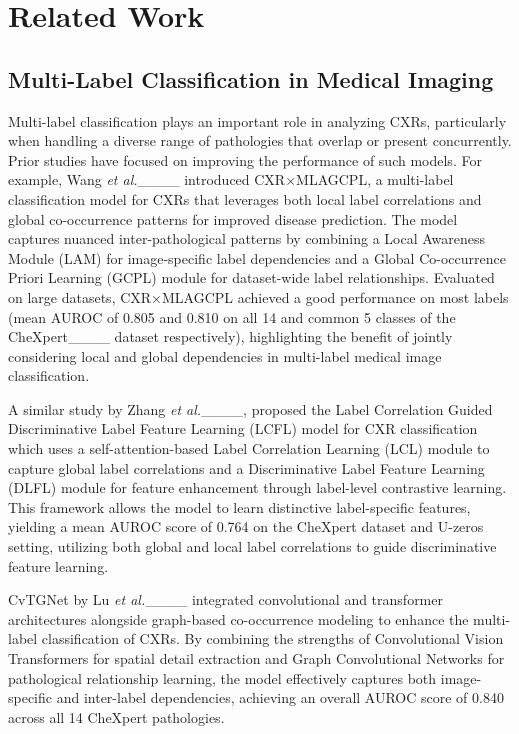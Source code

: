 \section{Related Work}
\subsection{Multi-Label Classification in Medical Imaging}
Multi-label classification plays an important role in analyzing CXRs, particularly when handling a diverse range of pathologies that overlap or present concurrently. Prior studies have focused on improving the performance of such models. For example, Wang \textit{et al.}____ introduced CXR×MLAGCPL, a multi-label classification model for CXRs that leverages both local label correlations and global co-occurrence patterns for improved disease prediction. The model captures nuanced inter-pathological patterns by combining a Local Awareness Module (LAM) for image-specific label dependencies and a Global Co-occurrence Priori Learning (GCPL) module for dataset-wide label relationships. Evaluated on large datasets, CXR×MLAGCPL achieved a good performance on most labels (mean AUROC of 0.805 and 0.810 on all 14 and common 5 classes of the CheXpert____ dataset respectively), highlighting the benefit of jointly considering local and global dependencies in multi-label medical image classification.

A similar study by Zhang \textit{et al.}____, proposed the Label Correlation Guided Discriminative Label Feature Learning (LCFL) model for CXR classification which uses a self-attention-based Label Correlation Learning (LCL) module to capture global label correlations and a Discriminative Label Feature Learning (DLFL) module for feature enhancement through label-level contrastive learning. This framework allows the model to learn distinctive label-specific features, yielding a mean AUROC score of 0.764 on the CheXpert dataset and U-zeros setting, utilizing both global and local label correlations to guide discriminative feature learning.

CvTGNet by Lu \textit{et al.}____ integrated convolutional and transformer architectures alongside graph-based co-occurrence modeling to enhance the multi-label classification of CXRs. By combining the strengths of Convolutional Vision Transformers for spatial detail extraction and Graph Convolutional Networks for pathological relationship learning, the model effectively captures both image-specific and inter-label dependencies, achieving an overall AUROC score of 0.840 across all 14 CheXpert pathologies.

